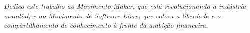 \begin{dedicatoria}
   \vspace*{\fill}
   \centering
   \noindent
   \textit{Dedico este trabalho ao Movimento Maker, que está revolucionando a indústria mundial, e ao
   Movimento de Software Livre, que coloca a liberdade e o compartilhamento de conhecimento à
   frente da ambição financeira.} \vspace*{\fill}
\end{dedicatoria}
